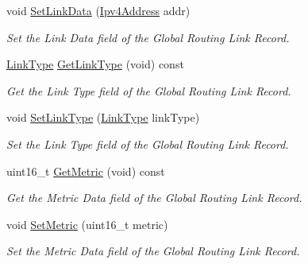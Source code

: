 \begin{DoxyCompactItemize}
void \hyperlink{classns3_1_1GlobalRoutingLinkRecord_a8d5328f737fc9b8a744a5cd2d0cc6434}{Set\+Link\+Data} (\hyperlink{classns3_1_1Ipv4Address}{Ipv4\+Address} addr)
\begin{DoxyCompactList}\small\item\em Set the Link Data field of the Global Routing Link Record. \end{DoxyCompactList}\item 
\hyperlink{classns3_1_1GlobalRoutingLinkRecord_a9380bcce9bca03943c4761b166a694f4}{Link\+Type} \hyperlink{classns3_1_1GlobalRoutingLinkRecord_a0549e23a7f4ba7e3bfe7e132743f62cd}{Get\+Link\+Type} (void) const 
\begin{DoxyCompactList}\small\item\em Get the Link Type field of the Global Routing Link Record. \end{DoxyCompactList}\item 
void \hyperlink{classns3_1_1GlobalRoutingLinkRecord_af848628baf0e27699d057d06114a01f6}{Set\+Link\+Type} (\hyperlink{classns3_1_1GlobalRoutingLinkRecord_a9380bcce9bca03943c4761b166a694f4}{Link\+Type} link\+Type)
\begin{DoxyCompactList}\small\item\em Set the Link Type field of the Global Routing Link Record. \end{DoxyCompactList}\item 
uint16\+\_\+t \hyperlink{classns3_1_1GlobalRoutingLinkRecord_a2090904e1965bb8ea44289f94ffee191}{Get\+Metric} (void) const 
\begin{DoxyCompactList}\small\item\em Get the Metric Data field of the Global Routing Link Record. \end{DoxyCompactList}\item 
void \hyperlink{classns3_1_1GlobalRoutingLinkRecord_a336b65b7fee309ef50ccfd962d4c04e8}{Set\+Metric} (uint16\+\_\+t metric)
\begin{DoxyCompactList}\small\item\em Set the Metric Data field of the Global Routing Link Record. \end{DoxyCompactList}\end{DoxyCompactItemize}
